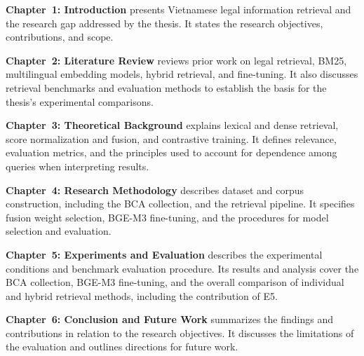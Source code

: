 \textbf{Chapter~1: Introduction} presents Vietnamese legal information retrieval and the research gap addressed by the thesis. It states the research objectives, contributions, and scope.

\textbf{Chapter~2: Literature Review} reviews prior work on legal retrieval, BM25, multilingual embedding models, hybrid retrieval, and fine-tuning. It also discusses retrieval benchmarks and evaluation methods to establish the basis for the thesis's experimental comparisons.

\textbf{Chapter~3: Theoretical Background} explains lexical and dense retrieval, score normalization and fusion, and contrastive training. It defines relevance, evaluation metrics, and the principles used to account for dependence among queries when interpreting results.

\textbf{Chapter~4: Research Methodology} describes dataset and corpus construction, including the BCA collection, and the retrieval pipeline. It specifies fusion weight selection, BGE-M3 fine-tuning, and the procedures for model selection and evaluation.

\textbf{Chapter~5: Experiments and Evaluation} describes the experimental conditions and benchmark evaluation procedure. Its results and analysis cover the BCA collection, BGE-M3 fine-tuning, and the overall comparison of individual and hybrid retrieval methods, including the contribution of E5.

\textbf{Chapter~6: Conclusion and Future Work} summarizes the findings and contributions in relation to the research objectives. It discusses the limitations of the evaluation and outlines directions for future work.
